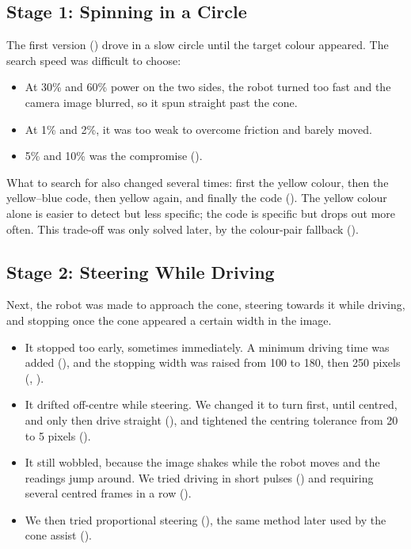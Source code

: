 \subsection{Stage 1: Spinning in a Circle}

The first version () drove in a slow circle until the target
colour appeared. The search speed was difficult to choose:

\begin{itemize}
  \item At 30\% and 60\% power on the two sides, the robot turned too fast and the
    camera image blurred, so it spun straight past the cone.
  \item At 1\% and 2\%, it was too weak to overcome friction and barely moved.
  \item 5\% and 10\% was the compromise ().
\end{itemize}

What to search for also changed several times: first the yellow colour, then the
yellow--blue code, then yellow again, and finally the code (). The
yellow colour alone is easier to detect but less specific; the code is specific
but drops out more often. This trade-off was only solved later, by the
colour-pair fallback ().

\subsection{Stage 2: Steering While Driving}

Next, the robot was made to approach the cone, steering towards it while
driving, and stopping once the cone appeared a certain width in the image.

\begin{itemize}
  \item It stopped too early, sometimes immediately. A minimum driving time was
    added (), and the stopping width was raised from 100 to 180,
    then 250 pixels (, ).
  \item It drifted off-centre while steering. We changed it to turn first, until
    centred, and only then drive straight (), and tightened the
    centring tolerance from 20 to 5 pixels ().
  \item It still wobbled, because the image shakes while the robot moves and the
    readings jump around. We tried driving in short pulses () and
    requiring several centred frames in a row ().
  \item We then tried proportional steering (), the same method
    later used by the cone assist ().
\end{itemize}

